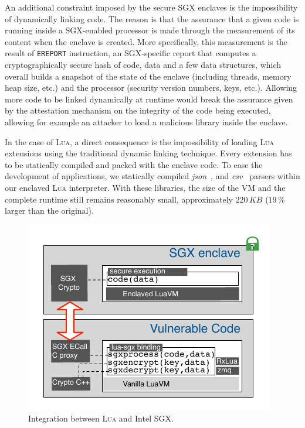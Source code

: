 An additional constraint imposed by the secure SGX enclaves is the impossibility of dynamically linking code.
The reason is that the assurance that a given code is running inside a SGX-enabled processor is made through the measurement of its content when the enclave is created.
More specifically, this measurement is the result of \texttt{EREPORT} instruction, an SGX-specific report that computes a cryptographically secure hash of code, data and a few data structures, which overall builds a snapshot of the state of the enclave (including threads, memory heap size, etc.) and the processor (security version numbers, keys, etc.).
Allowing more code to be linked dynamically at runtime would break the assurance given by the attestation mechanism on the integrity of the code being executed, allowing for example an attacker to load a malicious library inside the enclave.

In the case of \textsc{Lua}, a direct consequence is the impossibility of loading \textsc{Lua} extensions using the traditional dynamic linking technique.
Every extension has to be statically compiled and packed with the enclave code.
To ease the development of \SS applications, we statically compiled \emph{json}~\cite{rfc7159}, and \emph{csv}~\cite{rfc4180} parsers within our enclaved \textsc{Lua} interpreter.
With these libraries, the size of the VM and the complete runtime still remains reasonably small, approximately $220\,\mathit{KB}$ ($19\,\mathit{\%}$ larger than the original).

\begin{figure}[t!]
  \centering
  \includegraphics[width=.75\linewidth]{Figures/arch-sgxlua}
  \caption{Integration between \textsc{Lua} and Intel{\textregistered} SGX.}
  \label{fig:arch-luasgx}
\end{figure}


